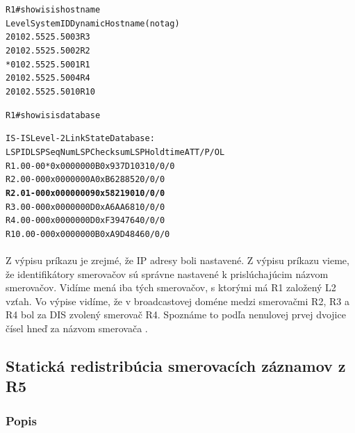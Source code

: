 \documentclass[12pt,twoside,a4paper]{report}
\begin{document}
\noindent
{\selectfont
\begin{small}
\begin{alltt}

R1#show isis hostname
Level  System ID      Dynamic Hostname  (notag)
 2     0102.5525.5003 R3
 2     0102.5525.5002 R2
     * 0102.5525.5001 R1
 2     0102.5525.5004 R4
 2     0102.5525.5010 R10

\end{alltt}
\end{small}
}

\noindent
{\selectfont
\begin{small}
\begin{alltt}
R1#show isis database

IS-IS Level-2 Link State Database:
LSPID                 LSP Seq Num  LSP Checksum  LSP Holdtime      ATT/P/OL
R1.00-00            * 0x0000000B   0x937D        1031              0/0/0
R2.00-00              0x0000000A   0xB628        852               0/0/0
\textbf{R2.01-00              0x00000009   0x5821        901               0/0/0}
R3.00-00              0x0000000D   0xA6AA        681               0/0/0
R4.00-00              0x0000000D   0xF394        764               0/0/0
R10.00-00             0x0000000B   0xA9D4        846               0/0/0
\end{alltt}
\end{small}
}

\paragraph{}
Z výpisu príkazu  je zrejmé, že IP adresy boli nastavené. Z výpisu príkazu  vieme, že identifikátory smerovačov sú správne nastavené k prislúchajúcim názvom smerovačov. Vidíme mená iba tých smerovačov, s ktorými má R1 založený L2 vzťah. Vo výpise  vidíme, že v broadcastovej doméne medzi smerovačmi R2, R3 a R4 bol za DIS zvolený smerovač R4. Spoznáme to podľa nenulovej prvej dvojice čísel hneď za názvom smerovača .








\subsection{Statická redistribúcia smerovacích záznamov z R5}
\subsubsection{Popis}
\end{document}
